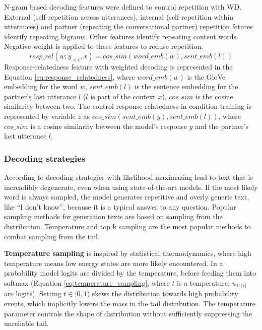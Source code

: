 N-gram based decoding features were defined to control repetition with WD. External (self-repetition across utterances), internal (self-repetition within utterances) and partner (repeating the conversational partner) repetition fetures identify repeating bigrams. Other features identify repeating content words. Negative weight is applied to these features to reduse repetition. 
\begin{equation} \label{eq:response_relatedness}
resp\_rel(w; y_{<t}, x) = cos\_sim(word\_emb(w), sent\_emb(l)) 
\end{equation}
Response-relatedness feature with weighted decoding is represented in the Equation \ref{eq:response_relatedness}, where $word\_emb(w)$ is the GloVe embedding for the word $w$, $sent\_emb(l)$ is the sentence embedding for the partner's last utterance $l$ ($l$ is part of the context $x$), $cos\_sim$ is the cosine similarity between two.
The control response-relatedness in condition training is represented by variable $z$ as $cos\_sim(sent\_emb(y), sent\_emb(l))$, where $cos\_sim$ is a cosine similarity between the model's response $y$ and the partner's last utterance $l$.

\subsubsection{Decoding strategies}
According to \cite{holtzman2019curious} decoding strategies with likelihood maximazing lead to text that is increadibly degenerate, even when using state-of-the-art models. If the most likely word is always sampled, the model generates repetitive and overly generic text, like ``I don't know'', because it is a typical answer to any question. Popular sampling methods for generation texts are based on sampling from the distribution. Temperature and top k sampling are the most popular methods to combat sampling from the tail.

\textbf{Temperature sampling} is inspired by statistical thermodynamics, where high temperature means low energy states are more likely encountered. In a probability model logits are divided by the temperature, before feeding them into softmax (Equation \ref{eq:temperature_sampling}, where $t$ is a temperature, $u_{1:|V|}$ are logits). Setting $t \in [0,1)$ skews the distribution towards high probability events, which implicitly lowers the mass in the tail distribution. The temperature parameter controls the shape of distribution without sufficiently suppressing the unreliable tail.

